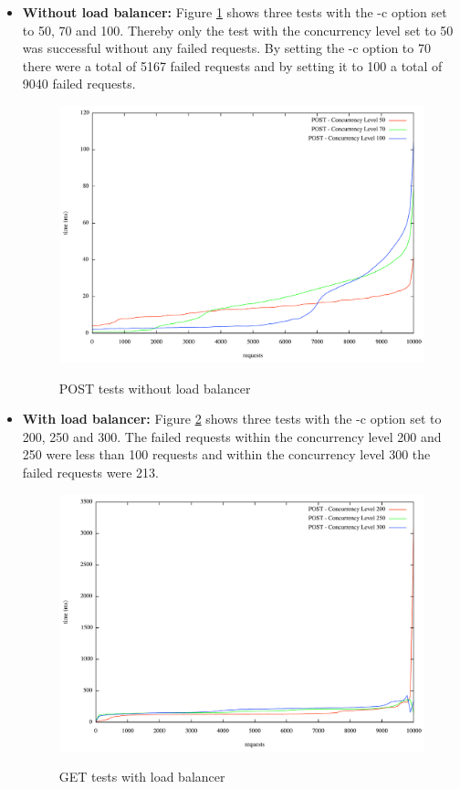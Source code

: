 \begin{itemize}
\item{\textbf{Without load balancer:}} Figure \ref{fig:post_without_load} shows three tests with the -c option set to 50, 70 and 100. Thereby only the test with the concurrency level set to 50 was successful without any failed requests. By setting the -c option to 70 there were a total of 5167 failed requests and by setting it to 100 a total of 9040 failed requests.

\begin{figure}[htb]
  \centering
  \includegraphics[scale=0.4]{img/Without_LoadBalancer_100_70_50_POST}\\
  \caption{POST tests without load balancer}
  \label{fig:post_without_load}
\end{figure}

\item{\textbf{With load balancer:}} Figure \ref{fig:get_with_load} shows three tests with the -c option set to 200, 250 and 300. The  failed requests within the concurrency level 200 and 250 were less than 100 requests and within the concurrency level 300 the failed requests were 213.

\begin{figure}[htb]
  \centering
  \includegraphics[scale=0.4]{img/With_LoadBalancer_200_250_300_POST}\\
  \caption{GET tests with load balancer}
  \label{fig:get_with_load}
\end{figure}
\end{itemize}